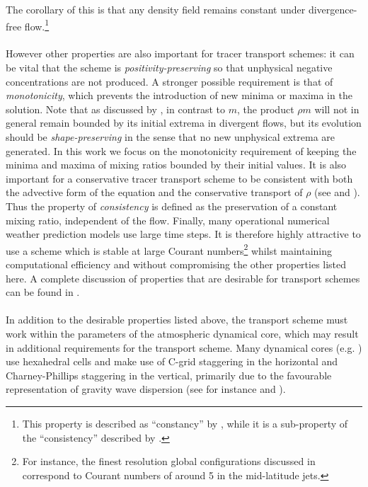 \documentclass{ametsocV6.1}
\begin{document}
The corollary of this is that any density field remains constant under divergence-free flow.\footnote{This property is described as ``constancy'' by \citet{leonard1996cosmic}, while it is a sub-property of the ``consistency'' described by \citet{lin1996ffsl}.}
\\
\\
However other properties are also important for tracer transport schemes: it can be vital that the scheme is \textit{positivity-preserving} so that unphysical negative concentrations are not produced.
A stronger possible requirement is that of \textit{monotonicity}, which prevents the introduction of new minima or maxima in the solution.
Note that as discussed by \citet{lauritzen2011numerical}, in contrast to $m$, the product $\rho m$ will not in general remain bounded by its initial extrema in divergent flows, but its evolution should be \textit{shape-preserving} in the sense that no new unphysical extrema are generated.
In this work we focus on the monotonicity requirement of keeping the minima and maxima of mixing ratios bounded by their initial values.
It is also important for a conservative tracer transport scheme to be consistent with both the advective form of the equation and the conservative transport of $\rho$ (see \citep{jockel2001fundamental} and \citep{zhang2008consistency}).
Thus the property of \textit{consistency} is defined as the preservation of a constant mixing ratio, independent of the flow.
Finally, many operational numerical weather prediction models use large time steps.
It is therefore highly attractive to use a scheme which is stable at large Courant numbers\footnote{For instance, the finest resolution global configurations discussed in \citet{walters2019met} correspond to Courant numbers of around 5 in the mid-latitude jets.}
whilst maintaining computational efficiency and without compromising the other properties listed here.
A complete discussion of properties that are desirable for transport schemes can be found in \citet{lauritzen2011numerical}.
\\
\\
In addition to the desirable properties listed above, the transport scheme must work within the parameters of the atmospheric dynamical core, which may result in additional requirements for the transport scheme.
Many dynamical cores (e.g. \citep{chen2008new,wood2014inherently,girard2014staggered,melvin2024mixed}) use hexahedral cells and make use of C-grid staggering in the horizontal and Charney-Phillips staggering \citep{charney1953verticalstaggering} in the vertical, primarily due to the favourable representation of gravity wave dispersion (see for instance \citet{staniforth2012horizontal} and \citet{thuburn2022numerical}). 
\end{document}
